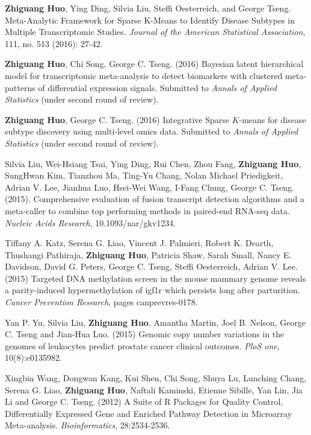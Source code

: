 \documentclass[a4paper, 10pt]{article}
\begin{document}
\begin{thebibliography}{9}
{\bf Zhiguang Huo}, Ying Ding, Silvia Liu, Steffi Oesterreich, and George Tseng. Meta-Analytic Framework for Sparse K-Means to Identify Disease Subtypes in Multiple Transcriptomic Studies. \emph{Journal of the American Statistical Association},  111, no. 513 (2016): 27-42.
 
{\bf Zhiguang Huo}, Chi Song, George C. Tseng. (2016)
Bayesian latent hierarchical model for transcriptomic meta-analysis to detect biomarkers with clustered meta-patterns of differential expression signals. Submitted to \emph{Annals of Applied Statistics} (under second round of review).

{\bf Zhiguang Huo}, George C. Tseng. (2016)
Integrative Sparse $K$-means for disease subtype discovery using multi-level omics data.
Submitted to \emph{Annals of Applied Statistics} (under second round of review).

Silvia Liu, Wei-Hsiang Tsai, Ying Ding, Rui Chen, Zhou Fang, {\bf Zhiguang Huo}, SungHwan Kim, Tianzhou Ma, Ting-Yu Chang, Nolan Michael Priedigkeit, Adrian V. Lee, Jianhua Luo, Hsei-Wei Wang, I-Fang Chung, George C. Tseng. (2015).
Comprehensive evaluation of fusion transcript detection algorithms and a meta-caller to combine top performing methods in paired-end RNA-seq data.
\emph{Nucleic Acids Research}, 10.1093/nar/gkv1234.
 
Tiffany A. Katz, Serena G. Liao, Vincent J. Palmieri, Robert K. Dearth, Thushangi Pathiraja, {\bf Zhiguang Huo}, Patricia Shaw, Sarah Small, Nancy E. Davidson, David G. Peters, George C. Tseng, Steffi Oesterreich, Adrian V. Lee. (2015) Targeted DNA methylation screen in the mouse mammary genome reveals a parity-induced hypermethylation of igf1r which persists long after parturition. \emph{Cancer Prevention Research}, pages canprevres-0178.

Yan P. Yu, Silvia Liu, {\bf Zhiguang Huo}, Amantha Martin, Joel B. Nelson, George C. Tseng and Jian-Hua Luo. (2015) Genomic copy number variations in the genomes of leukocytes predict prostate cancer clinical outcomes. \emph{PloS one}, 10(8):e0135982.

Xingbin Wang, Dongwan Kang, Kui Shen, Chi Song, Shuya Lu, Lunching Chang, Serena G. Liao, {\bf Zhiguang Huo}, Naftali Kaminski, Etienne Sibille, Yan Lin, Jia Li and George C. Tseng. (2012) A Suite of R Packages for Quality Control, Differentially Expressed Gene and Enriched Pathway Detection in Microarray Meta-analysis. \emph{Bioinformatics}, 28:2534-2536.
    


\end{thebibliography}
\end{document}
